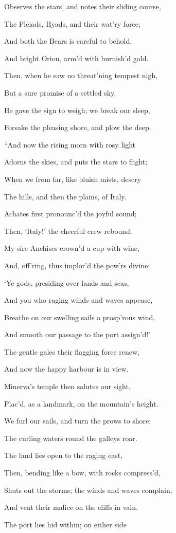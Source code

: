 Observes the stars, and notes their sliding course,

The Pleiads, Hyads, and their wat’ry force;

And both the Bears is careful to behold,

And bright Orion, arm’d with burnish’d gold.

Then, when he saw no threat’ning tempest nigh,

But a sure promise of a settled sky,

He gave the sign to weigh; we break our sleep,

Forsake the pleasing shore, and plow the deep.

“And now the rising morn with rosy light

Adorns the skies, and puts the stars to flight;

When we from far, like bluish mists, descry

The hills, and then the plains, of Italy.

Achates first pronounc’d the joyful sound;

Then, ‘Italy!’ the cheerful crew rebound.

My sire Anchises crown’d a cup with wine,

And, off’ring, thus implor’d the pow’rs divine:

‘Ye gods, presiding over lands and seas,

And you who raging winds and waves appease,

Breathe on our swelling sails a prosp’rous wind,

And smooth our passage to the port assign’d!’

The gentle gales their flagging force renew,

And now the happy harbour is in view.

Minerva’s temple then salutes our sight,

Plac’d, as a landmark, on the mountain’s height.

We furl our sails, and turn the prows to shore;

The curling waters round the galleys roar.

The land lies open to the raging east,

Then, bending like a bow, with rocks compress’d,

Shuts out the storms; the winds and waves complain,

And vent their malice on the cliffs in vain.

The port lies hid within; on either side

